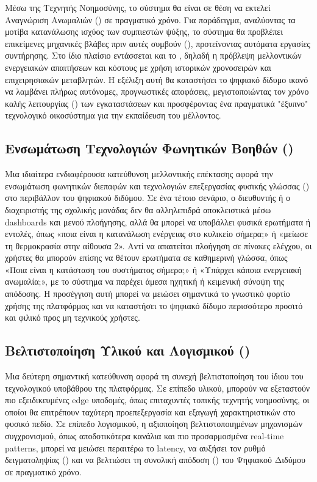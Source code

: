 Μέσω της Τεχνητής Νοημοσύνης, το σύστημα θα είναι σε θέση να εκτελεί Αναγνώριση Ανωμαλιών () σε πραγματικό χρόνο. Για παράδειγμα, αναλύοντας τα μοτίβα κατανάλωσης ισχύος των συμπιεστών ψύξης, το σύστημα θα προβλέπει επικείμενες μηχανικές βλάβες πριν αυτές συμβούν (), προτείνοντας αυτόματα εργασίες συντήρησης. Στο ίδιο πλαίσιο εντάσσεται και το , δηλαδή η πρόβλεψη μελλοντικών ενεργειακών απαιτήσεων και κόστους με χρήση ιστορικών χρονοσειρών και επιχειρησιακών μεταβλητών. Η εξέλιξη αυτή θα καταστήσει το ψηφιακό δίδυμο ικανό να λαμβάνει πλήρως αυτόνομες, προγνωστικές αποφάσεις, μεγιστοποιώντας τον χρόνο καλής λειτουργίας () των εγκαταστάσεων και προσφέροντας ένα πραγματικά "έξυπνο" τεχνολογικό οικοσύστημα για την εκπαίδευση του μέλλοντος.

\subsection{Ενσωμάτωση Τεχνολογιών Φωνητικών Βοηθών ()}
Μια ιδιαίτερα ενδιαφέρουσα κατεύθυνση μελλοντικής επέκτασης αφορά την ενσωμάτωση φωνητικών διεπαφών και τεχνολογιών επεξεργασίας φυσικής γλώσσας () στο περιβάλλον του ψηφιακού διδύμου. Σε ένα τέτοιο σενάριο, ο διευθυντής ή ο διαχειριστής της σχολικής μονάδας δεν θα αλληλεπιδρά αποκλειστικά μέσω dashboards και μενού πλοήγησης, αλλά θα μπορεί να υποβάλλει φυσικά ερωτήματα ή εντολές, όπως «ποια είναι η κατανάλωση ενέργειας στο κυλικείο σήμερα;» ή «μείωσε τη θερμοκρασία στην αίθουσα 2». Αντί να απαιτείται πλοήγηση σε πίνακες ελέγχου, οι χρήστες θα μπορούν επίσης να θέτουν ερωτήματα σε καθημερινή γλώσσα, όπως «Ποια είναι η κατάσταση του συστήματος σήμερα;» ή «Υπάρχει κάποια ενεργειακή ανωμαλία;», με το σύστημα να παρέχει άμεσα ηχητική ή κειμενική σύνοψη της απόδοσης. Η προσέγγιση αυτή μπορεί να μειώσει σημαντικά το γνωστικό φορτίο χρήσης της πλατφόρμας και να καταστήσει το ψηφιακό δίδυμο περισσότερο προσιτό και φιλικό προς μη τεχνικούς χρήστες.

\subsection{Βελτιστοποίηση Υλικού και Λογισμικού ()}
Μια δεύτερη σημαντική κατεύθυνση αφορά τη συνεχή βελτιστοποίηση του ίδιου του τεχνολογικού υποβάθρου της πλατφόρμας. Σε επίπεδο υλικού, μπορούν να εξεταστούν πιο εξειδικευμένες edge υποδομές, όπως επιταχυντές τοπικής τεχνητής νοημοσύνης, οι οποίοι θα επιτρέπουν ταχύτερη προεπεξεργασία και εξαγωγή χαρακτηριστικών στο φυσικό πεδίο. Σε επίπεδο λογισμικού, η αξιοποίηση βελτιστοποιημένων μηχανισμών συγχρονισμού, όπως αποδοτικότερα κανάλια  και πιο προσαρμοσμένα real-time patterns, μπορεί να μειώσει περαιτέρω το latency, να αυξήσει τον ρυθμό δειγματοληψίας () και να βελτιώσει τη συνολική απόδοση () του Ψηφιακού Διδύμου σε πραγματικό χρόνο.


